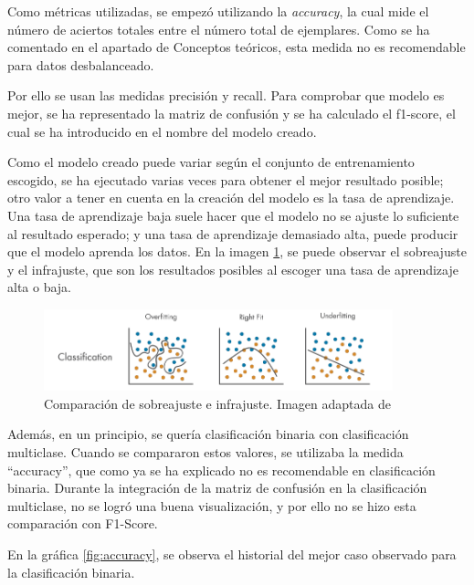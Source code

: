 Como métricas utilizadas, se empezó utilizando la \textit{accuracy}, la cual mide el número de aciertos totales entre el número total de ejemplares. Como se ha comentado en el apartado de Conceptos teóricos, esta medida no es recomendable para datos desbalanceado.

Por ello se usan las medidas precisión y recall. Para comprobar que modelo es mejor, se ha representado la matriz de confusión y se ha calculado el f1-score, el cual se ha introducido en el nombre del modelo creado.

Como el modelo creado puede variar según el conjunto de entrenamiento escogido, se ha ejecutado varias veces para obtener el mejor resultado posible; otro valor a tener en cuenta en la creación del modelo es la tasa de aprendizaje. Una tasa de aprendizaje baja suele hacer que el modelo no se ajuste lo suficiente al resultado esperado; y una tasa de aprendizaje demasiado alta, puede producir que el modelo aprenda los datos. En la imagen \ref{fig:overfiting}, se puede observar el sobreajuste y el infrajuste, que son los resultados posibles al escoger una tasa de aprendizaje alta o baja.
        \begin{figure}[!ht]
                 \centering
                 \includegraphics[width=0.9\textwidth]{img/overfiting-underfiting.png}
                  \caption{Comparación de sobreajuste e infrajuste. Imagen adaptada de \cite{mathworks-overfitting}}
                 \label{fig:overfiting}
        \end{figure}

Además, en un principio, se quería clasificación binaria con clasificación multiclase. Cuando se compararon estos valores, se utilizaba la medida ``accuracy'', que como ya se ha explicado no es recomendable en clasificación binaria. Durante la integración de la matriz de confusión en la clasificación multiclase, no se logró una buena visualización, y por ello no se hizo esta comparación con F1-Score.

En la gráfica \ref{fig:accuracy}, se observa el historial del mejor caso observado para la clasificación binaria.

